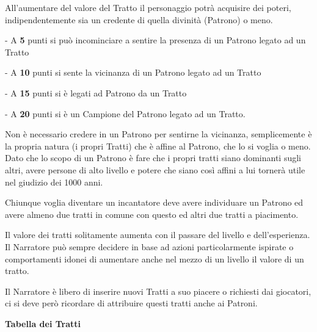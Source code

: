 \documentclass[a4paper,11pt,twoside,openany]{book}
\begin{document}
All'aumentare del valore del Tratto il personaggio potrà acquisire dei poteri, indipendentemente sia un credente di quella divinità (Patrono) o meno.


- A \textbf{5} punti si può incominciare a sentire la presenza di un Patrono legato ad un Tratto

- A \textbf{10} punti si sente la vicinanza di un Patrono legato ad un Tratto

- A \textbf{15}  punti si è legati ad Patrono da un Tratto

- A \textbf{20} punti si è un Campione del Patrono legato ad un Tratto.


Non è necessario credere in un Patrono per sentirne la vicinanza, semplicemente è la propria natura (i propri Tratti) che è affine al Patrono, che lo si voglia o meno.
Dato che lo scopo di un Patrono è fare che i propri tratti siano dominanti sugli altri, avere persone di alto livello e potere che siano così affini a lui tornerà utile nel giudizio dei 1000 anni.

Chiunque voglia diventare un incantatore deve avere individuare un Patrono ed avere almeno due tratti in comune con questo ed altri due tratti a piacimento.

\smallskip

Il valore dei tratti solitamente aumenta con il passare del livello e dell'esperienza. Il Narratore può sempre decidere in base ad azioni particolarmente ispirate o comportamenti idonei di aumentare anche nel mezzo di un livello il valore di un tratto.

Il Narratore è libero di inserire nuovi Tratti a suo piacere o richiesti dai giocatori, ci si deve però ricordare di attribuire questi tratti anche ai Patroni.

\bigskip

\pagebreak

\textbf{Tabella dei Tratti}

\bigskip
\end{document}
